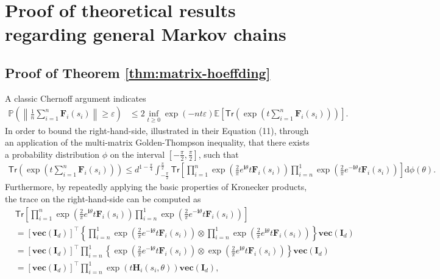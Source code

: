 \section{Proof of theoretical results regarding general Markov chains}

\subsection{Proof of Theorem \ref{thm:matrix-hoeffding}}\label{app:proof-matrix-hoeffding}
A classic Chernoff argument indicates
\begin{align}\label{eq:matrix-chernoff}
\mathbb{P}\left(\left\|\frac{1}{n}\sum_{i=1}^n \bm{F}_i(s_i)\right\| \geq \varepsilon \right) &\leq 2\inf_{t \geq 0} \exp(-nt\varepsilon) \mathbb{E}\left[\mathsf{Tr}\left(\exp\left(t\sum_{i=1}^n \bm{F}_i(s_i)\right)\right)\right].
\end{align}
In order to bound the right-hand-side, \cite{garg2018matrixexpanderchernoff} illustrated in their Equation (11), through an application of the multi-matrix Golden-Thompson inequality, that there exists a probability distribution $\phi$ on the interval $[-\frac{\pi}{2},\frac{\pi}{2}]$, such that
\begin{align}\label{eq:multi-matrix-golden-thompson}
\mathsf{Tr}\left(\exp\left(t\sum_{i=1}^n \bm{F}_i(s_i)\right)\right) \leq d^{1-\frac{\pi}{4}}\int_{-\frac{\pi}{2}}^{\frac{\pi}{2}}\mathsf{Tr}\left[\prod_{i=1}^n \exp\left(\frac{2}{\pi}e^{\mathbf{i}\theta}t\bm{F}_i(s_i)\right)\prod_{i=n}^1 \exp\left(\frac{2}{\pi}e^{-\mathbf{i}\theta}t\bm{F}_i(s_i)\right)\right]\mathrm{d}\phi(\theta).
\end{align}
Furthermore, by repeatedly applying the basic properties of Kronecker products, the trace on the right-hand-side can be computed as 
\begin{align}\label{eq:matrix-hoeffding-kronecker}
&\mathsf{Tr}\left[\prod_{i=1}^n \exp\left(\frac{2}{\pi}e^{\mathbf{i}\theta}t\bm{F}_i(s_i)\right)\prod_{i=n}^1 \exp\left(\frac{2}{\pi}e^{-\mathbf{i}\theta}t\bm{F}_i(s_i)\right)\right] \nonumber \\ 
&= [\mathbf{vec}(\bm{I}_d)]^\top \left\{\prod_{i=n}^1 \exp\left(\frac{2}{\pi}e^{-\mathbf{i}\theta}t\bm{F}_i(s_i)\right) \otimes  \prod_{i=n}^1\exp\left(\frac{2}{\pi}e^{\mathbf{i}\theta}t\bm{F}_i(s_i)\right)\right\}\mathbf{vec}(\bm{I}_d) \nonumber \\ 
&= [\mathbf{vec}(\bm{I}_d)]^\top \prod_{i=n}^1\left\{\exp\left(\frac{2}{\pi}e^{-\mathbf{i}\theta}t\bm{F}_i(s_i)\right) \otimes \exp\left(\frac{2}{\pi}e^{\mathbf{i}\theta}t\bm{F}_i(s_i)\right)\right\}\mathbf{vec}(\bm{I}_d) \nonumber \\ 
&= [\mathbf{vec}(\bm{I}_d)]^\top \prod_{i=n}^1 \exp(t\bm{H}_i(s_i,\theta))\mathbf{vec}(\bm{I}_d),
\end{align}
